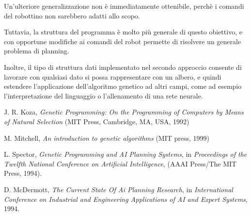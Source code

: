 \documentclass[paper=a4, fontsize=11pt]{scrartcl}
\numberwithin{equation}{section}		%
\numberwithin{figure}{section}			%
\numberwithin{table}{section}				%
\begin{document}
Un'ulteriore generalizzazione non è immediatamente ottenibile, perchè i comandi del robottino non sarebbero adatti allo scopo.

Tuttavia, la struttura del programma è molto più generale di questo obiettivo, e con opportune modifiche ai comandi del robot permette di risolvere un generale problema di planning.

Inoltre, il tipo di struttura dati implementato nel secondo approccio consente di lavorare con qualsiasi dato si possa rappresentare con un albero, e quindi estendere l'applicazione dell'algoritmo genetico ad altri campi, come ad esempio l'interpretazione del linguaggio o l'allenamento di una rete neurale.




\begin{thebibliography}{55}
  J. R. Koza, \emph{Genetic Programming: On the Programming of Computers by Means of Natural Selection} (MIT Press, Cambridge, MA, USA, 1992)

 M. Mitchell, \emph{An introduction to genetic algorithms} (MIT press, 1999)

 L. Spector, \emph{Genetic Programming and AI Planning Systems}, in \emph{Proceedings of the Twelfth National Conference on Artificial
Intelligence},  (AAAI Press/The MIT Press, 1994).

 D. McDermott, \emph{The Current State Of Ai Planning Research}, in \emph{International Conference on Industrial and Engineering Applications of AI and Expert Systems}, 1994.


\end{thebibliography}

\end{document}
